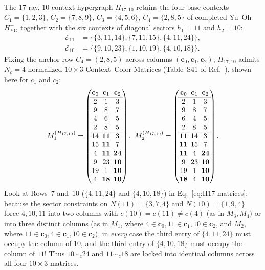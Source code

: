 \documentclass[aps,pra,reprint,superscriptaddress,longbibliography,nofootinbib,floatfix,10pt]{revtex4-2}
\theoremstyle{definition}\newtheorem{definition}[theorem]{Definition}
\theoremstyle{remark}\newtheorem{remark}[theorem]{Remark}
\newcommand{\YO}{\mathrm{YO}}\newcommand{\ip}[2]{\langle #1,#2\rangle}
\begin{document}
The $17$-ray, $10$-context hypergraph $H_{17,10}$ retains the four base contexts $C_1=\{1,2,3\}$, $C_2=\{7,8,9\}$, $C_3=\{4,5,6\}$, $C_4=\{2,8,5\}$ of completed Yu--Oh $H_{\YO}^+$ together with the six contexts of diagonal sectors $h_1=11$ and $h_2=10$:
\begin{equation}\label{eq:H17-sectors}
\begin{aligned}
\mathcal{E}_{11}&=\bigl\{\{3,11,14\},\{7,11,15\},\{4,11,24\}\bigr\},\\
\mathcal{E}_{10}&=\bigl\{\{9,10,23\},\{1,10,19\},\{4,10,18\}\bigr\}.
\end{aligned}
\end{equation}
Fixing the anchor row $C_4=(2,8,5)$ across columns $(\mathbf{c}_0,\mathbf{c}_1,\mathbf{c}_2)$, $H_{17,10}$ admits $N_c=4$ normalized $10\times 3$ Context--Color Matrices (Table~S41 of Ref.~\cite{supplement}), shown here for $c_1$ and $c_2$:
\begin{equation}\label{eq:H17-matrices}
\setlength{\arraycolsep}{2.2pt}
M_1^{(H_{17,10})}=\begin{pmatrix}
\mathbf{c}_0&\mathbf{c}_1&\mathbf{c}_2\\\hline
2&1&3\\
9&8&7\\
4&6&5\\
2&8&5\\\hline
14&\mathbf{11}&3\\
15&\mathbf{11}&7\\
4&\mathbf{11}&\mathbf{24}\\\hline
9&23&\mathbf{10}\\
19&1&\mathbf{10}\\
4&\mathbf{18}&\mathbf{10}
\end{pmatrix},\ 
M_2^{(H_{17,10})}=\begin{pmatrix}
\mathbf{c}_0&\mathbf{c}_1&\mathbf{c}_2\\\hline
2&1&3\\
9&8&7\\
6&4&5\\
2&8&5\\\hline
\mathbf{11}&14&3\\
\mathbf{11}&15&7\\
\mathbf{11}&4&\mathbf{24}\\\hline
9&23&\mathbf{10}\\
19&1&\mathbf{10}\\
\mathbf{18}&4&\mathbf{10}
\end{pmatrix}.
\end{equation}
Look at Rows~7 and~10 ($\{4,11,24\}$ and $\{4,10,18\}$) in Eq.~\eqref{eq:H17-matrices}: because the sector constraints on $N(11)=\{3,7,4\}$ and $N(10)=\{1,9,4\}$ force $4,10,11$ into two columns with $c(10)=c(11)\neq c(4)$ (as in $M_3,M_4$) or into three distinct columns (as in $M_1$, where $4\in\mathbf{c}_0,11\in\mathbf{c}_1,10\in\mathbf{c}_2$, and $M_2$, where $11\in\mathbf{c}_0,4\in\mathbf{c}_1,10\in\mathbf{c}_2$), in \emph{every} case the third entry of $\{4,11,24\}$ must occupy the column of $10$, and the third entry of $\{4,10,18\}$ must occupy the column of $11$! Thus $10\sim_c 24$ and $11\sim_c 18$ are locked into identical columns across all four $10\times 3$ matrices.
\end{document}
